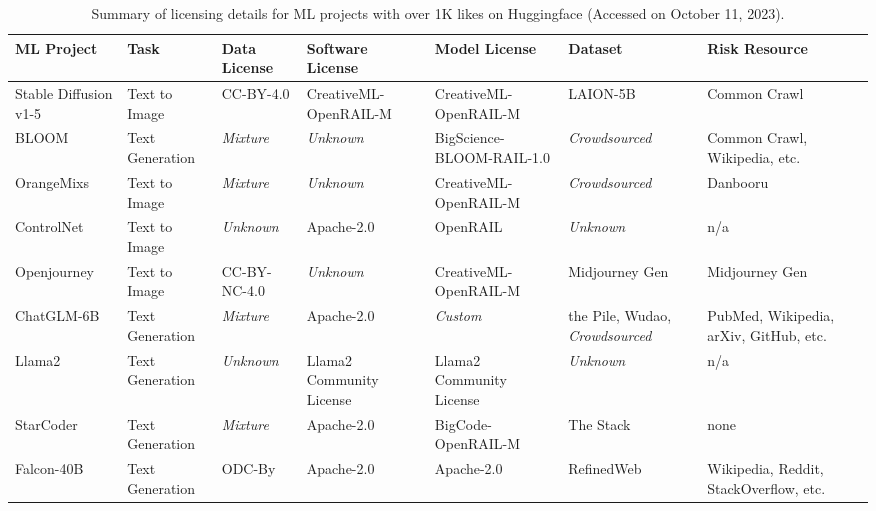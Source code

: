 \begin{table}[t]
  \caption{Summary of licensing details for ML projects with over 1K likes on Huggingface (Accessed on October 11, 2023). }
  \footnotesize
  \label{tab:MLP}
  \begin{tabular}{|p{2.1cm}|p{1.6cm}|p{2cm}|p{2.75cm}|p{3cm}|p{1.7cm}|p{2cm}|}
      \hline
      \rowcolor[gray]{.8}
      \textbf{ML Project} & \textbf{Task} & \textbf{Data License} & \textbf{Software License} & \textbf{Model License} & \textbf{Dataset} & \textbf{Risk Resource} \\ \hline
      
      Stable Diffusion v1-5 & Text to Image & CC-BY-4.0 & CreativeML-OpenRAIL-M & CreativeML-OpenRAIL-M & LAION-5B & Common Crawl \\ \hline
      
      BLOOM & Text Generation & \textit{Mixture} & \textit{Unknown} & BigScience-BLOOM-RAIL-1.0 & \textit{Crowdsourced} & Common Crawl, \newline Wikipedia, etc. \\ \hline

      OrangeMixs & Text to Image & \textit{Mixture} & \textit{Unknown} & CreativeML-OpenRAIL-M & \textit{Crowdsourced} & Danbooru \\ \hline

      ControlNet & Text to Image &  \textit{Unknown} & Apache-2.0 & OpenRAIL & \textit{Unknown} & n/a \\ \hline

      Openjourney & Text to Image &  CC-BY-NC-4.0 & \textit{Unknown} & CreativeML-OpenRAIL-M & Midjourney Gen & Midjourney Gen \\ \hline

      ChatGLM-6B & Text Generation &  \textit{Mixture} & Apache-2.0 & \textit{Custom} & the Pile, Wudao, \newline \textit{Crowdsourced} & PubMed,  Wikipedia, \newline arXiv, GitHub, etc. \\ \hline

      Llama2 & Text Generation &  \textit{Unknown} & Llama2 Community License & Llama2 Community License & \textit{Unknown} & n/a \\ \hline

      StarCoder & Text Generation &  \textit{Mixture} & Apache-2.0 & BigCode-OpenRAIL-M & The Stack & none \\ \hline

      Falcon-40B & Text Generation & ODC-By & Apache-2.0 & Apache-2.0 & RefinedWeb & Wikipedia, Reddit, \newline StackOverflow, etc. \\ \hline


\end{tabular}
\end{table}

